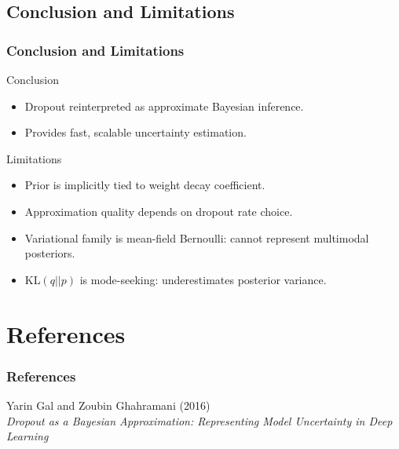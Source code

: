 \documentclass[
	11pt, %
]{beamer}
\begin{document}
\subsection{Conclusion and Limitations}

\begin{frame}
	\frametitle{Conclusion and Limitations}

	\begin{block}{Conclusion}
		\begin{itemize}
			\item Dropout reinterpreted as approximate Bayesian inference.
			\item Provides fast, scalable uncertainty estimation.
		\end{itemize}
	\end{block}

	\begin{alertblock}{Limitations}

	\begin{itemize}
		\item Prior is implicitly tied to weight decay coefficient.
		\item Approximation quality depends on dropout rate choice.
		\item Variational family is mean-field Bernoulli: cannot represent multimodal posteriors.
		\item KL$(q||p)$ is mode-seeking: underestimates posterior variance.
	\end{itemize}

	\end{alertblock}

\end{frame}


\section{References}

\begin{frame}
	\frametitle{References}
	
	\footnotesize
	
	Yarin Gal and Zoubin Ghahramani (2016) \\
	\textit{Dropout as a Bayesian Approximation: Representing Model Uncertainty in Deep Learning} \\
	
\end{frame}

\end{document}
